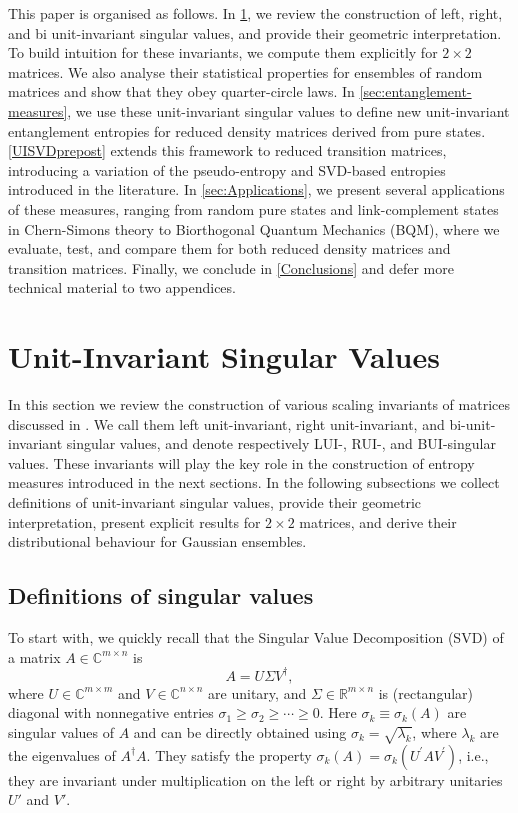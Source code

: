 \documentclass[11pt,a4paper]{article}
\begin{document}
This paper is organised as follows. In \cref{sec-scale}, we review the construction of left, right, and bi unit-invariant singular values, and provide their geometric interpretation. To build intuition for these invariants, we compute them explicitly for $2\times2$ matrices. We also analyse their statistical properties for ensembles of random matrices and show that they obey quarter-circle laws. In \cref{sec:entanglement-measures}, we use these unit-invariant singular values to define new unit-invariant entanglement entropies for reduced density matrices derived from pure states. \cref{UISVDprepost} extends this framework to reduced transition matrices, introducing a variation of the pseudo-entropy and SVD-based entropies introduced in the literature. In \cref{sec:Applications}, we present several applications of these measures, ranging from random pure states and link-complement states in Chern-Simons theory to Biorthogonal Quantum Mechanics (BQM), where we evaluate, test, and compare them for both reduced density matrices and transition matrices. Finally, we conclude in \cref{Conclusions} and defer more technical material to two appendices.
\section{Unit-Invariant Singular Values} \label{sec-scale}
In this section we review the construction of various scaling invariants of matrices discussed in \cite{uhlmann-main2}. We call them left unit-invariant, right unit-invariant, and bi-unit-invariant singular values, and denote respectively LUI-, RUI-, and BUI-singular values. These invariants will play the key role in the construction of entropy measures introduced in the next sections. In the following subsections we collect definitions of unit-invariant singular values, provide their geometric interpretation, present explicit results for $2\times2$ matrices, and derive their distributional behaviour for Gaussian ensembles.
\subsection{Definitions of singular values}
To start with, we quickly recall that the Singular Value Decomposition (SVD) of a matrix \(A \in \mathbb{C}^{m\times n}\) is
\begin{equation}
A = U\Sigma V^{\dagger},
\end{equation}
where \(U\in\mathbb{C}^{m\times m}\) and \(V\in\mathbb{C}^{n\times n}\) are unitary, and \(\Sigma\in\mathbb{R}^{m\times n}\) is (rectangular) diagonal with nonnegative entries \(\sigma_1\ge \sigma_2\ge \cdots \ge 0\). Here $\sigma_k\equiv \sigma_k(A)$ are singular values of $A$ and can be directly obtained using \(\sigma_k=\sqrt{\lambda_k}\), where \(\lambda_k\) are the eigenvalues of \(A^{\dagger}A\). They satisfy the property $\sigma_k(A)=\sigma_k(U^\prime AV^\prime)$, i.e., they are invariant under multiplication on the left or right by arbitrary unitaries $U'$ and $V'$.
\end{document}
